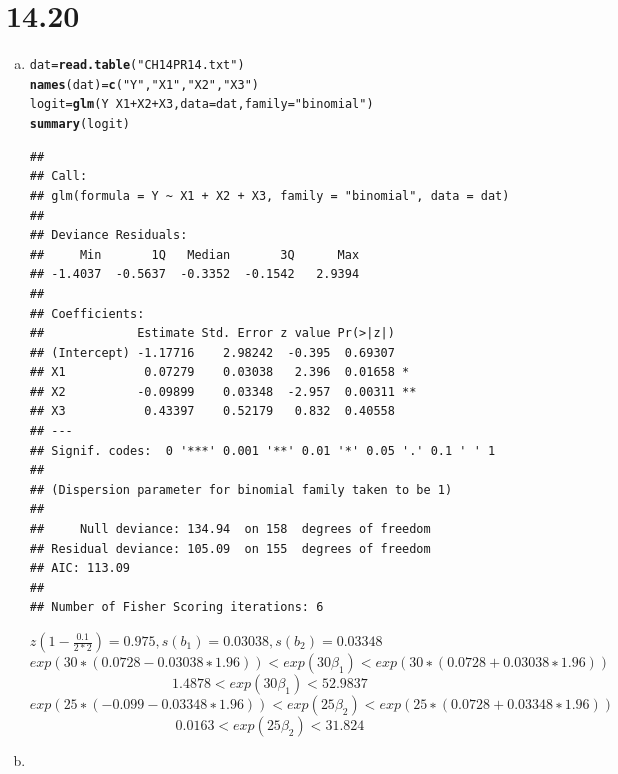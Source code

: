 \documentclass{article}\usepackage[]{graphicx}\usepackage[]{color}
\makeatletter
\newcommand{\hlstr}[1]{\textcolor[rgb]{0.192,0.494,0.8}{#1}}%
\newcommand{\hlopt}[1]{\textcolor[rgb]{0,0,0}{#1}}%
\newcommand{\hlstd}[1]{\textcolor[rgb]{0.345,0.345,0.345}{#1}}%
\newcommand{\hlkwb}[1]{\textcolor[rgb]{0.69,0.353,0.396}{#1}}%
\newcommand{\hlkwc}[1]{\textcolor[rgb]{0.333,0.667,0.333}{#1}}%
\newcommand{\hlkwd}[1]{\textcolor[rgb]{0.737,0.353,0.396}{\textbf{#1}}}%
\newenvironment{kframe}{%
 \def\at@end@of@kframe{}%
 \ifinner\ifhmode%
  \def\at@end@of@kframe{\end{minipage}}%
  \begin{minipage}{\columnwidth}%
 \fi\fi%
 \def\FrameCommand##1{\hskip\@totalleftmargin \hskip-\fboxsep
 \colorbox{shadecolor}{##1}\hskip-\fboxsep
     \hskip-\linewidth \hskip-\@totalleftmargin \hskip\columnwidth}%
 \MakeFramed {\advance\hsize-\width
   \@totalleftmargin\z@ \linewidth\hsize
   \@setminipage}}%
 {\par\unskip\endMakeFramed%
 \at@end@of@kframe}
\newenvironment{knitrout}{}{} %
\makeatother
\begin{document}
\section{14.20}

\begin{enumerate}[(a)]

\item

\begin{knitrout}
\color{fgcolor}\begin{kframe}
\begin{alltt}
  \hlstd{dat} \hlkwb{=} \hlkwd{read.table}\hlstd{(}\hlstr{"CH14PR14.txt"}\hlstd{)}
  \hlkwd{names}\hlstd{(dat)} \hlkwb{=} \hlkwd{c}\hlstd{(}\hlstr{"Y"}\hlstd{,} \hlstr{"X1"}\hlstd{,} \hlstr{"X2"}\hlstd{,} \hlstr{"X3"}\hlstd{)}
  \hlstd{logit} \hlkwb{=} \hlkwd{glm}\hlstd{(Y} \hlopt{~} \hlstd{X1} \hlopt{+} \hlstd{X2} \hlopt{+} \hlstd{X3,} \hlkwc{data} \hlstd{= dat,} \hlkwc{family} \hlstd{=} \hlstr{"binomial"}\hlstd{)}
  \hlkwd{summary}\hlstd{(logit)}
\end{alltt}
\begin{verbatim}
## 
## Call:
## glm(formula = Y ~ X1 + X2 + X3, family = "binomial", data = dat)
## 
## Deviance Residuals: 
##     Min       1Q   Median       3Q      Max  
## -1.4037  -0.5637  -0.3352  -0.1542   2.9394  
## 
## Coefficients:
##             Estimate Std. Error z value Pr(>|z|)   
## (Intercept) -1.17716    2.98242  -0.395  0.69307   
## X1           0.07279    0.03038   2.396  0.01658 * 
## X2          -0.09899    0.03348  -2.957  0.00311 **
## X3           0.43397    0.52179   0.832  0.40558   
## ---
## Signif. codes:  0 '***' 0.001 '**' 0.01 '*' 0.05 '.' 0.1 ' ' 1
## 
## (Dispersion parameter for binomial family taken to be 1)
## 
##     Null deviance: 134.94  on 158  degrees of freedom
## Residual deviance: 105.09  on 155  degrees of freedom
## AIC: 113.09
## 
## Number of Fisher Scoring iterations: 6
\end{verbatim}
\end{kframe}
\end{knitrout}

\qquad $z(1-\frac{0.1}{2*2})=0.975, s(b_1)=0.03038, s(b_2)=0.03348$
$$exp(30∗(0.0728−0.03038∗1.96))<exp(30\beta_1)<exp(30∗(0.0728+0.03038∗1.96))$$
$$1.4878<exp(30\beta_1)<52.9837$$
$$exp(25∗(−0.099−0.03348∗1.96))<exp(25\beta_2)<exp(25∗(0.0728+0.03348∗1.96))$$
$$0.0163 <exp(25\beta_2)< 31.824$$
\item


\end{enumerate}
\end{document}

